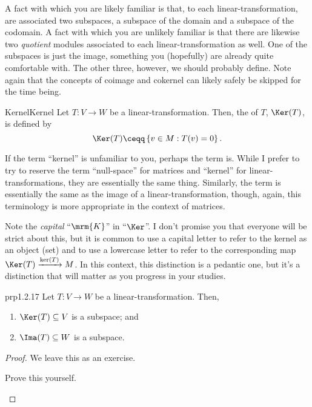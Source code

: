 A fact with which you are likely familiar is that, to each linear-transformation, are associated two subspaces, a subspace of the domain and a subspace of the codomain.  A fact with which you are unlikely familiar is that there are likewise two \emph{quotient} modules associated to each linear-transformation as well.  One of the subspaces is just the image, something you (hopefully) are already quite comfortable with.  The other three, however, we should probably define.  Note again that the concepts of coimage and cokernel can likely safely be skipped for the time being.
\begin{dfn}{Kernel}{Kernel}
	Let $T\colon V\rightarrow W$ be a linear-transformation.  Then, the  of $T$, $\Ker (T)$, is defined by
	\begin{equation}
	\Ker (T)\ceqq \left\{ v\in M:T(v)=0\right\} .
	\end{equation}
	\begin{rmk}
		If the term ``kernel'' is unfamiliar to you, perhaps the term  is.  While I prefer to try to reserve the term ``null-space'' for matrices and ``kernel'' for linear-transformations, they are essentially the same thing.  Similarly, the term  is essentially the same as the image of a linear-transformation, though, again, this terminology is more appropriate in the context of matrices.
	\end{rmk}
	\begin{rmk}
		Note the \emph{capital} ``$\mrm{K}$'' in ``$\Ker$''.    I don't promise you that everyone will be strict about this, but it is common to use a capital letter to refer to the kernel as an object (set) and to use a lowercase letter to refer to the corresponding map $\Ker (T)\xrightarrow{\ker (T)}M$.  In this context, this distinction is a pedantic one, but it's a distinction that will matter as you progress in your studies.
	\end{rmk}
\end{dfn}
\begin{prp}{}{prp1.2.17}
	Let $T\colon V\rightarrow W$ be a linear-transformation.  Then,
	\begin{enumerate}
		\item $\Ker (T)\subseteq V$ is a subspace; and
		\item $\Ima (T)\subseteq W$ is a subspace.
	\end{enumerate}
	\begin{proof}
		We leave this as an exercise.
		\begin{exr}[breakable=false]{}{}
			Prove this yourself.
		\end{exr}
	\end{proof}
\end{prp}
